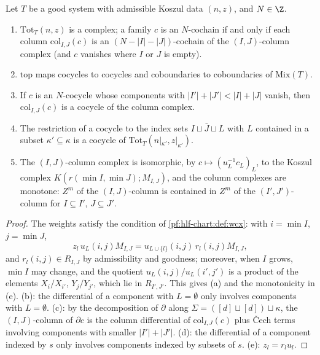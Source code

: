 \begin{lemma}\label{pf:hlf-chart:sysbasic}
Let $T$ be a good system with admissible Koszul data $(n,z)$, and $N\in\Z$.
\begin{enumerate}[label=\textup{(\alph*)},nosep]
\item $\mathrm{Tot}_T(n,z)$ is a complex; a family $c$ is an $N$-cochain if and only if each column $\mathrm{col}_{I,J}(c)$ is an
  $(N-|I|-|J|)$-cochain of the $(I,J)$-column complex (and $c$ vanishes where $I$ or $J$ is empty).
\item $\mathrm{top}$ maps cocycles to cocycles and coboundaries to coboundaries of $\mathrm{Mix}(T)$.
\item If $c$ is an $N$-cocycle whose components with $|I'|+|J'|<|I|+|J|$ vanish, then $\mathrm{col}_{I,J}(c)$ is a cocycle of the column complex.
\item The restriction of a cocycle to the index sets $I\sqcup\bar J\sqcup L$ with $L$ contained in a subset $\kappa'\subseteq\kappa$ is a cocycle of
  $\mathrm{Tot}_T(n|_{\kappa'},z|_{\kappa'})$.
\item The $(I,J)$-column complex is isomorphic, by $c\mapsto(u_L^{-1}c_L)_L$, to the Koszul complex $K(r(\min I,\min J);M_{I,J})$, and the
  column complexes are monotone: $Z^m$ of the $(I,J)$-column is contained in $Z^m$ of the $(I',J')$-column for $I\subseteq I'$, $J\subseteq J'$.
\end{enumerate}
\end{lemma}

\begin{proof}
The weights satisfy the condition of \cref{pf:hlf-chart:def:wcx}: with $i=\min I$, $j=\min J$,
\[
  z_l\,u_L(i,j)M_{I,J}=u_{L\cup\{l\}}(i,j)\,r_l(i,j)M_{I,J},
\]
and $r_l(i,j)\in R_{I,J}$ by admissibility and goodness; moreover, when $I$ grows, $\min I$ may change, and the quotient
$u_L(i,j)/u_L(i',j')$ is a product of the elements $X_i/X_{i'}$, $Y_j/Y_{j'}$, which lie in $R_{I',J'}$. This gives (a) and the monotonicity in (e).
(b): the differential of a component with $L=\emptyset$ only involves components with $L=\emptyset$. (c): by the decomposition of $\partial$ along
$\Sigma=([d]\sqcup[d])\sqcup\kappa$, the $(I,J)$-column of $\partial c$ is the column differential of $\mathrm{col}_{I,J}(c)$ plus \v{C}ech terms
involving components with smaller $|I'|+|J'|$. (d): the differential of a component indexed by $s$ only involves components indexed by subsets of
$s$. (e): $z_l=r_lu_l$.
\end{proof}

